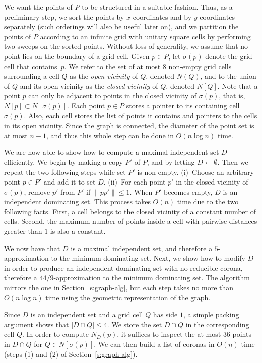 \documentclass[preprint,12pt]{elsarticle}
\begin{document}
We want the points of $P$ to be structured in a suitable fashion. Thus, as a preliminary step, we sort the points by $x$-coordinates and by $y$-coordinates separately (such orderings will also be useful later on), and we partition the points of $P$ according to an infinite grid with unitary square cells by performing two sweeps on the sorted points. Without loss of generality, we assume that no point lies on the boundary of a grid cell. Given $p \in P$, let $\sigma(p)$ denote the grid cell that contains~$p$. We refer to the set of at most $8$ non-empty grid cells surrounding a cell $Q$ as the \emph{open vicinity} of $Q$, denoted $N(Q)$, and to the union of $Q$ and its open vicinity as the \emph{closed vicinity} of $Q$, denoted $N[Q]$. Note that a point $p$ can only be adjacent to points in the closed vicinity of $\sigma(p)$, that is, $N[p] \subset N[\sigma(p)]$. Each point $p \in P$ stores a pointer to its containing cell $\sigma(p)$. Also, each cell stores the list of points it contains and pointers to the cells in its open vicinity. 
Since the graph is connected, the diameter of the point set is at most $n-1$, and thus this whole step can be done in $O(n \log n)$ time.

We are now able to show how to compute a maximal independent set $D$ efficiently. We begin by making a copy $P'$ of $P$, and by letting $D \gets \emptyset$. Then we repeat the two following steps while set $P'$ is non-empty. (i)~Choose an arbitrary point $p \in P'$ and add it to set $D$. (ii)~For each point $p'$ in the closed vicinity of $\sigma(p)$, remove $p'$ from $P'$ if $\|pp'\| \leq 1$. When $P'$ becomes empty, $D$ is an independent dominating set.
This process takes $O(n)$ time due to the two following facts. First, a cell belongs to the closed vicinity of a constant number of cells. Second, the maximum number of points inside a cell with pairwise distances greater than $1$ is also a constant.

We now have that $D$ is a maximal independent set, and therefore \linebreak a $5$-approximation to the minimum dominating set. Next, we show how to modify $D$ in order to produce an independent dominating set with no reducible corona, therefore a $44/9$-approximation to the minimum dominating set. The algorithm mirrors the one in Section~\ref{s:graph-alg}, but each step takes no more than  $O(n \log n)$ time using the geometric representation of the graph.

Since $D$ is an independent set and a grid cell $Q$ has side $1$, a simple packing argument shows that $|D \cap Q| \leq 4$. We store the set $D \cap Q$ in the corresponding cell $Q$. In order to compute $N_D(p)$, it suffices to inspect the at most $36$ points in $D \cap Q$ for $Q \in N[\sigma(p)]$. We can then build a list of coronas in $O(n)$ time (steps (1) and (2) of Section~\ref{s:graph-alg}).
\end{document}
